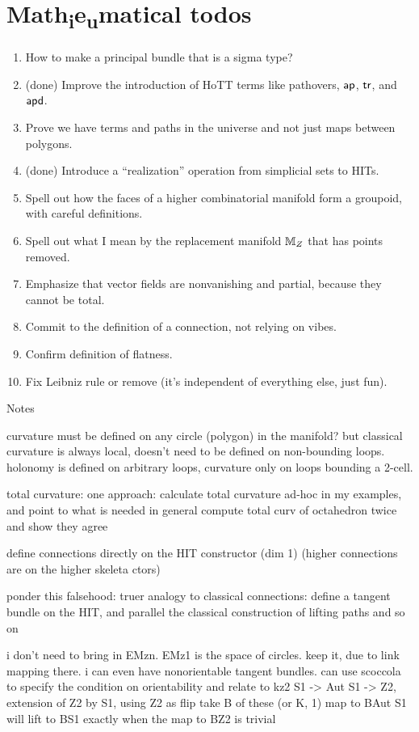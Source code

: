 \section*{\texorpdfstring{Math\textsubscript{i}e\textsubscript{u}matical}{Mathematical} todos}
\begin{enumerate}
\item How to make a principal bundle that is a sigma type? 
\item (done) Improve the introduction of HoTT terms like pathovers, \( \mathsf{ap} \), \( \mathsf{tr} \), and \( \mathsf{apd} \).
\item Prove we have terms and paths in the universe and not just maps between polygons.
\item (done) Introduce a ``realization'' operation from simplicial sets to HITs.
\item Spell out how the faces of a higher combinatorial manifold form a groupoid, with careful definitions.
\item Spell out what I mean by the replacement manifold \( \mathbb{M}_Z \) that has points removed.
\item Emphasize that vector fields are nonvanishing and partial, because they cannot be total.
\item Commit to the definition of a connection, not relying on vibes.
\item Confirm definition of flatness.
\item Fix Leibniz rule or remove (it's independent of everything else, just fun).
\end{enumerate}
Notes

curvature must be defined on any circle (polygon) in the manifold?
but classical curvature is always local, doesn't need to be defined on non-bounding loops.
holonomy is defined on arbitrary loops, curvature only on loops bounding a 2-cell.

total curvature:
one approach: calculate total curvature ad-hoc in my examples, and point to what is needed in general
compute total curv of octahedron twice and show they agree

define connections directly on the HIT constructor (dim 1) (higher connections are on the higher skeleta ctors)

ponder this falsehood: truer analogy to classical connections: define a tangent bundle on the HIT, and parallel the classical construction of lifting paths and so on

i don't need to bring in EMzn. EMz1 is the space of circles. keep it, due to link mapping there.
i can even have nonorientable tangent bundles. can use scoccola to specify the condition on orientability and relate to kz2
S1 -> Aut S1 -> Z2, extension of Z2 by S1, using Z2 as  flip
take B of these (or K, 1)
map to BAut S1 will lift to BS1 exactly when the map to BZ2 is trivial


